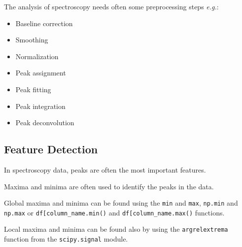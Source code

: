 \documentclass[
  letterpaper,
  DIV=11,
  numbers=noendperiod]{scrreprt}
\providecommand{\tightlist}{%
  \setlength{\itemsep}{0pt}\setlength{\parskip}{0pt}}\usepackage{longtable,booktabs,array}
\begin{document}
The analysis of spectroscopy needs often some preprocessing steps
\emph{e.g.}:

\begin{itemize}
\tightlist
\item
  Baseline correction
\item
  Smoothing
\item
  Normalization
\item
  Peak assignment
\item
  Peak fitting
\item
  Peak integration
\item
  Peak deconvolution
\end{itemize}

\subsection*{Feature Detection}\label{feature-detection}

In spectroscopy data, peaks are often the most important features.

Maxima and minima are often used to identify the peaks in the data.

Global maxima and minima can be found using the \texttt{min} and
\texttt{max}, \texttt{np.min} and \texttt{np.max} or
\texttt{df{[}\textquotesingle{}column\_name\textquotesingle{}{]}.min()}
and
\texttt{df{[}\textquotesingle{}column\_name\textquotesingle{}{]}.max()}
functions.

Local maxima and minima can be found also by using the
\texttt{argrelextrema} function from the \texttt{scipy.signal} module.
\end{document}
